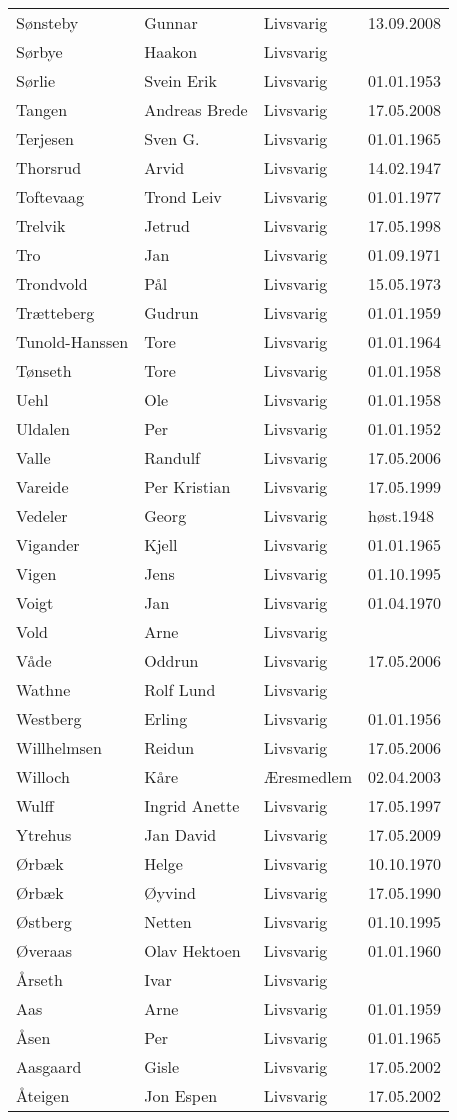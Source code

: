 \begin{longtable}{llll}
Sønsteby	&	Gunnar	&	Livsvarig	&	13.09.2008	\\
Sørbye	&	Haakon	&	Livsvarig 	&		\\
Sørlie	&	Svein Erik	&	Livsvarig 	&	01.01.1953	\\
Tangen	&	Andreas Brede	&	Livsvarig	&	17.05.2008	\\
Terjesen	&	Sven G.	&	Livsvarig 	&	01.01.1965	\\
Thorsrud	&	Arvid	&	Livsvarig 	&	14.02.1947	\\
Toftevaag	&	Trond Leiv	&	Livsvarig 	&	01.01.1977	\\
Trelvik 	&	Jetrud	&	Livsvarig	&	17.05.1998	\\
Tro	&	Jan	&	Livsvarig 	&	01.09.1971	\\
Trondvold	&	Pål	&	Livsvarig 	&	15.05.1973	\\
Trætteberg	&	Gudrun	&	Livsvarig 	&	01.01.1959	\\
Tunold-Hanssen	&	Tore	&	Livsvarig 	&	01.01.1964	\\
Tønseth	&	Tore	&	Livsvarig 	&	01.01.1958	\\
Uehl	&	Ole	&	Livsvarig 	&	01.01.1958	\\
Uldalen	&	Per	&	Livsvarig 	&	01.01.1952	\\
Valle	&	Randulf	&	Livsvarig	&	17.05.2006	\\
Vareide 	&	Per Kristian	&	Livsvarig	&	17.05.1999	\\
Vedeler	&	Georg	&	Livsvarig	&	høst.1948	\\
Vigander	&	Kjell	&	Livsvarig 	&	01.01.1965	\\
Vigen 	&	Jens	&	Livsvarig	&	01.10.1995	\\
Voigt	&	Jan	&	Livsvarig 	&	01.04.1970	\\
Vold	&	Arne	&	Livsvarig 	&		\\
Våde	&	Oddrun	&	Livsvarig	&	17.05.2006	\\
Wathne	&	Rolf Lund	&	Livsvarig 	&		\\
Westberg	&	Erling	&	Livsvarig 	&	01.01.1956	\\
Willhelmsen	&	Reidun	&	Livsvarig	&	17.05.2006	\\
Willoch	&	Kåre	&	Æresmedlem	&	02.04.2003	\\
Wulff 	&	Ingrid Anette	&	Livsvarig	&	17.05.1997	\\
Ytrehus	&	Jan David	&	Livsvarig	&	17.05.2009	\\
Ørbæk	&	Helge	&	Livsvarig 	&	10.10.1970	\\
Ørbæk	&	Øyvind	&	Livsvarig 	&	17.05.1990	\\
Østberg 	&	Netten	&	Livsvarig	&	01.10.1995	\\
Øveraas	&	Olav Hektoen	&	Livsvarig 	&	01.01.1960	\\
Årseth	&	Ivar	&	Livsvarig 	&		\\
Aas	&	Arne	&	Livsvarig 	&	01.01.1959	\\
Åsen	&	Per	&	Livsvarig 	&	01.01.1965	\\
Aasgaard 	&	Gisle	&	Livsvarig	&	17.05.2002	\\
Åteigen 	&	Jon Espen	&	Livsvarig	&	17.05.2002	\\
    \end{longtable}

